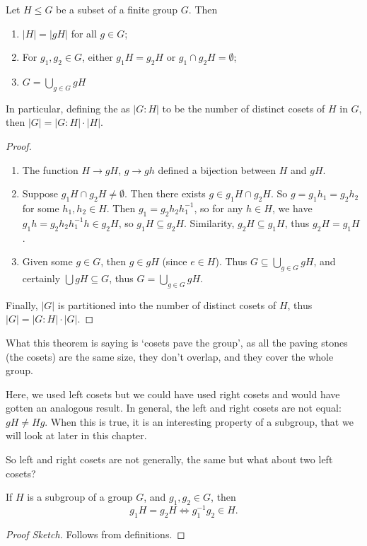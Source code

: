 \begin{theorem}
	Let $H \leq G$ be a subset of a finite group $G$. Then
	\begin{enumerate}[label=(\roman*)]
		\item $|H| = |gH|$ for all $g \in G$;
		\item For $g_1, g_2 \in G$, either $g_1 H = g_2 H$ or $g_1 
		\cap g_2 H = \emptyset$;
		\item $\displaystyle G = \bigcup_{g \in G} gH$
	\end{enumerate}
	In particular, defining the  as $|G : H|$ to be the number of distinct cosets of $H$ in $G$, then $|G| = |G : H| \cdot |H|$.
\end{theorem}
\begin{proof}$ $
	\begin{enumerate}[label=(\roman*)]
		\item The function $H \rightarrow gH$, $g \rightarrow gh$ defined a bijection between $H$ and $gH$.
		\item Suppose $g_1 H \cap g_2 H \neq \emptyset$. Then there exists $g \in g_1 H \cap g_2 H$. So $g = g_1 h_1 = g_2 h_2$ for some $h_1, h_2 \in H$. Then $g_1 = g_2 h_2 h_1^{-1}$, so for any $h \in H$, we have $g_1 h = g_2 h_2 h_1^{-1} h \in g_2 H$, so $g_1 H \subseteq g_2 H$. Similarity, $g_2 H \subseteq g_1 H$, thus $g_2 H = g_1 H$.
		\item Given some $g \in G$, then $g \in gH$ (since $e \in H$). Thus $G \subseteq \bigcup_{g \in G} gH$, and certainly $\bigcup gH \subseteq G$, thus $G = \bigcup_{g \in G} gH$.
	\end{enumerate}
	Finally, $|G|$ is partitioned into the number of distinct cosets of $H$, thus $|G| = |G:H|\cdot |G|$.
\end{proof}

What this theorem is saying is `cosets pave the group', as all the paving stones (the cosets) are the same size, they don't overlap, and they cover the whole group.

Here, we used left cosets but we could have used right cosets and would have gotten an analogous result. In general, the left and right cosets are not equal: $gH \neq Hg$. When this is true, it is an interesting property of a subgroup, that we will look at later in this chapter. 

So left and right cosets are not generally, the same but what about two left cosets?

\begin{proposition}
	If $H$ is a subgroup of a group $G$, and $g_1, g_2 \in G$, then
	$$
	g_1 H = g_2H \iff g_1^{-1} g_2 \in H.
	$$
\end{proposition}
\begin{proof}[Proof Sketch]
	Follows from definitions.
\end{proof}

